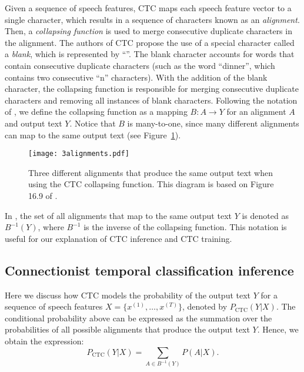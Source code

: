 Given a sequence of speech features, CTC maps each speech feature vector to a single character, which results in a sequence of characters known as an \emph{alignment}. 
Then, a \emph{collapsing function} is used to merge consecutive duplicate characters in the alignment.
The authors of CTC propose the use of a special character called a \emph{blank}, which is represented by ``\textvisiblespace''.
The blank character accounts for words that contain consecutive duplicate characters (such as the word ``dinner'', which contains two consecutive ``n'' characters).
With the addition of the blank character, the collapsing function is responsible for merging consecutive duplicate characters and removing all instances of blank characters.
Following the notation of \cite{jurafskyspeech}, we define the collapsing function as a mapping $B: A \rightarrow Y$ for an alignment $A$ and output text $Y$.
Notice that $B$ is many-to-one, since many different alignments can map to the same output text (see Figure~\ref{dinner}).

\begin{figure}[!ht]
    \centering
    
    \texttt{[image: 3alignments.pdf]}
    \caption{Three different alignments that produce the same output text when using the CTC collapsing function. This diagram is based on Figure 16.9 of \cite{jurafskyspeech}.}
    \label{dinner}
\end{figure}

In \cite{jurafskyspeech}, the set of all alignments that map to the same output text $Y$ is denoted as $B^{-1}(Y)$, 
where $B^{-1}$ is the inverse of the collapsing function.
This notation is useful for our explanation of CTC inference and CTC training.

\subsection{Connectionist temporal classification inference}
Here we discuss how CTC models the probability of the output text $Y$ 
for a sequence of speech features $X = \{x^{(1)}, \dots, x^{(T)}\}$, 
denoted by $P_{\text{CTC}}(Y|X)$.
The conditional probability above can be expressed as the summation over the probabilities
of all possible alignments that produce the output text $Y$. 
Hence, we obtain the expression: 
\begin{equation}
    P_{\text{CTC}}(Y|X) = \sum\limits_{A \in B^{-1}(Y)} P(A|X).
\end{equation}

